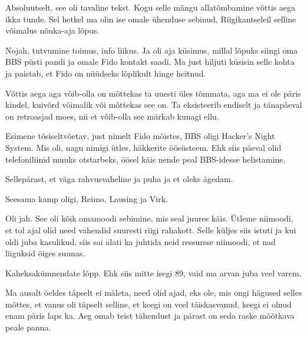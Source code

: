 
Absoluutselt, see oli tavaline tekst. Kogu selle mängu allatõmbamine võttis aega ikka tunde. Sel hetkel ma olin ise omale ühenduse sebinud, Riigikantseleil selline võimalus nõuka-aja lõpus. 

Nojah, tutvumine toimus, info liikus. Ja oli aja küsimus, millal lõpuks siingi  oma BBS püsti pandi ja omale Fido kontakt saadi. Ma just hiljuti küsisin selle kohta ja paistab, et Fido on nüüdseks lõplikult hinge heitnud.


Võttis aega aga võib-olla on mõttekas ta uuesti üles tõmmata, aga ma ei ole päris kindel, kuivõrd võimalik või mõttekas see on. Ta eksisteerib endiselt ja tänapäeval on retroasjad moes, nii et võib-olla see märkab kunagi ellu.
                 

Esimene tõsiseltvõetav, just nimelt Fido mõistes, BBS oligi Hacker's Night System. Mis oli, nagu nimigi ütles, häkkerite öösüsteem. Ehk siis päeval olid telefoniliinid muuks otstarbeks, öösel käis nende peal BBS-idesse helistamine. 


Sellepärast, et väga rahvusvaheline ja puha ja et oleks ägedam.

Seesama kamp oligi, Reimo, Lausing  ja Virk.
 

Oli jah. See oli kõik omamoodi sebimine, mis seal juures käis. Ütleme niimoodi, et tol ajal olid need vahendid suuresti riigi rahakott. Selle küljes siis istuti ja kui oldi juba kasulikud, siis sai alati ka juhtida neid ressursse niimoodi, et nad liiguksid õiges suunas. 


Kaheksakümnendate lõpp. Ehk siis mitte isegi 89, vaid ma arvan juba veel varem.
                 
Ma ausalt öeldes täpselt ei mäleta, need olid ajad, eks ole, mis ongi  hägused selles mõttes, et vanus oli täpselt selline, et keegi on veel  täiskasvanud, keegi ei olnud enam päris laps ka. Aeg omab teist tähendust ja pärast on seda raske mõõtkava peale panna.

